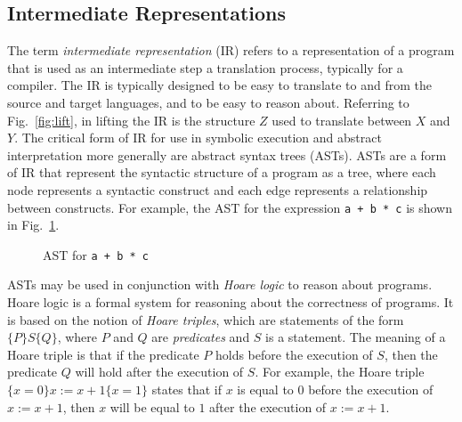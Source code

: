 \subsection{Intermediate Representations}

The term \emph{intermediate representation} (IR) refers to a representation of a program that is used as an intermediate step a translation process, typically for a compiler.
The IR is typically designed to be easy to translate to and from the source and target languages, and to be easy to reason about.
Referring to Fig.~\ref{fig:lift}, in lifting the IR is the structure $Z$ used to translate between $X$ and $Y$.
The critical form of IR for use in symbolic execution and abstract interpretation more generally are abstract syntax trees (ASTs).
ASTs are a form of IR that represent the syntactic structure of a program as a tree, where each node represents a syntactic construct and each edge represents a relationship between constructs.
For example, the AST for the expression \texttt{a + b * c} is shown in Fig.~\ref{fig:ast}.

\begin{figure}[h]
\centering
{}
\caption{AST for \texttt{a + b * c}}
\label{fig:ast}
\end{figure}

ASTs may be used in conjunction with \emph{Hoare logic} to reason about programs.
Hoare logic is a formal system for reasoning about the correctness of programs.
It is based on the notion of \emph{Hoare triples}, which are statements of the form $\{P\} S \{Q\}$, where $P$ and $Q$ are \emph{predicates} and $S$ is a statement.
The meaning of a Hoare triple is that if the predicate $P$ holds before the execution of $S$, then the predicate $Q$ will hold after the execution of $S$.
For example, the Hoare triple $\{x = 0\} x := x + 1 \{x = 1\}$ states that if $x$ is equal to $0$ before the execution of $x := x + 1$, then $x$ will be equal to $1$ after the execution of $x := x + 1$.

